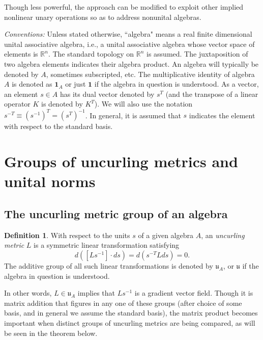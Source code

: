 \documentclass{amsart}
\numberwithin{equation}{section}
\theoremstyle{definition}
\newtheorem{definition}[theorem]{Definition}
\numberwithin{theorem}{section}
\begin{document}
  Though less powerful, the approach can be modified to exploit other implied nonlinear unary operations so as to address nonunital algebras.
  
  \bigskip
  
 {\it Conventions:}   Unless stated otherwise, ``algebra" means a real finite dimensional unital associative algebra, i.e., a unital associative algebra whose vector space of elements is $\mathbb{R}^n$. The standard topology on $\mathbb{R}^n$ is assumed.  The juxtaposition of two algebra elements indicates their algebra product.   An algebra will typically be denoted by $A$, sometimes subscripted, etc. The multiplicative identity of algebra $A$ is denoted as $\mathbf{1}_A$ or just $\mathbf{1}$ if the algebra in question is understood.   As a vector, an element $s\in A$ has its dual vector denoted by $s^T$ (and the transpose of a linear operator $K$ is denoted by $K^T$).   We will also use the notation $s^{-T} \equiv (s^{-1})^T = (s^T)^{-1}$.              
  In general, it is assumed that $s$ indicates the element with respect to the standard basis.

 \section{Groups of uncurling metrics and unital norms}
   
   \subsection{The uncurling metric group of an algebra}
     
  \begin{definition}\label{7/21/23.1} With respect to the units $s$ of a given algebra $A$, an {\it uncurling metric} $L$ is a symmetric linear transformation  satisfying \begin{equation}\label{4/7/23.1} d([Ls^{-1}]\cdot ds) = d\left(s^{-T} L ds\right) = 0. \end{equation}  The additive group of all such linear transformations is denoted by $\mathfrak{u}_A$, or $\mathfrak{u}$ if the algebra in question is understood. \end{definition}
   
   In other words, $L\in \mathfrak{u}_A$ implies that $Ls^{-1}$ is a gradient vector field.  Though it is matrix addition that figures in any one of these groups (after choice of some basis, and in general we assume the standard basis), the matrix product becomes important when distinct groups of uncurling metrics are being compared, as will be seen in the theorem below.
   
\end{document}
